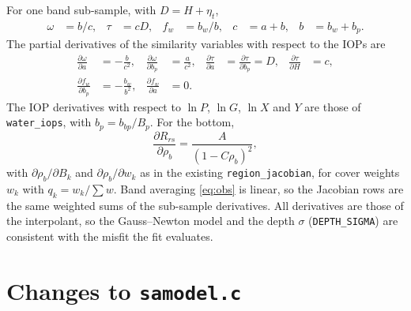 \documentclass[11pt]{article}
\numberwithin{equation}{section}
\newcommand{\code}[1]{\texttt{#1}}
\begin{document}
For one band sub-sample, with $D = H + \eta_t$,
\begin{align*}
\omega &= b/c, & \tau &= cD, & f_w &= b_w/b, & c &= a+b, & b &= b_w + b_p.
\end{align*}
The partial derivatives of the similarity variables with respect to the IOPs are
\begin{align}
\frac{\partial\omega}{\partial a} &= -\frac{b}{c^2}, & \frac{\partial\omega}{\partial b_p} &= \frac{a}{c^2},
& \frac{\partial\tau}{\partial a} &= \frac{\partial\tau}{\partial b_p} = D, & \frac{\partial\tau}{\partial H} &= c,\\
\frac{\partial f_w}{\partial b_p} &= -\frac{b_w}{b^2}, & \frac{\partial f_w}{\partial a} &= 0. \nonumber
\end{align}
The IOP derivatives with respect to $\ln P$, $\ln G$, $\ln X$ and $Y$ are those of
\code{water\_iops}, with $b_p = b_{bp}/B_p$. For the bottom,
\begin{equation}
\frac{\partial R_{rs}}{\partial\rho_b} = \frac{A}{(1-C\rho_b)^2},
\end{equation}
with $\partial\rho_b/\partial B_k$ and $\partial\rho_b/\partial w_k$ as in the existing
\code{region\_jacobian}, for cover weights $w_k$ with $q_k = w_k/\sum w$.
Band averaging \eqref{eq:obs} is linear, so the Jacobian rows are the same weighted sums of
the sub-sample derivatives. All derivatives are those of the interpolant, so the
Gauss--Newton model and the depth $\sigma$ (\code{DEPTH\_SIGMA}) are consistent with the
misfit the fit evaluates.

\section{Changes to \code{samodel.c}}\label{sec:samodel}
\end{document}
